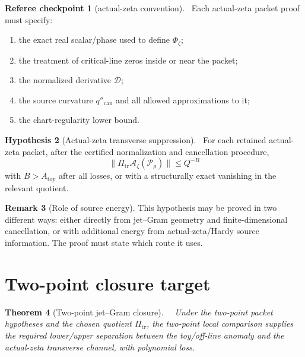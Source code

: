 \documentclass[11pt,a4paper]{amsart}
\newcommand{\Status}[1]{\textnormal{\fbox{\scriptsize\textsf{#1}}}}
\newcommand{\Core}{\Status{CORE}}
\newcommand{\Open}{\Status{OPEN}}
\newcommand{\Ph}{\Phi}
\newcommand{\D}{\mathcal D}
\newcommand{\Packet}{\mathcal P}
\newcommand{\Scale}{Q}
\newcommand{\can}{\mathrm{can}}
\newcommand{\toy}{\mathrm{toy}}
\newcommand{\trans}{\mathrm{tr}}
\theoremstyle{plain}
\newtheorem{theorem}{Theorem}[section]
\theoremstyle{definition}
\newtheorem{hypothesis}[theorem]{Hypothesis}
\newtheorem{checkpoint}[theorem]{Referee checkpoint}
\newtheorem{remark}[theorem]{Remark}
\begin{document}
\begin{checkpoint}[actual-zeta convention]
\label{chk:actual-zeta-convention}
\Core\
Each actual-zeta packet proof must specify:
\begin{enumerate}[label=\textup{Z\arabic*.},leftmargin=*]
\item the exact real scalar/phase used to define \(\Ph_\zeta\);
\item the treatment of critical-line zeros inside or near the packet;
\item the normalized derivative \(\D\);
\item the source curvature \(q''_{\can}\) and all allowed approximations to it;
\item the chart-regularity lower bound.
\end{enumerate}
\end{checkpoint}

\begin{hypothesis}[Actual-zeta transverse suppression]
\label{hyp:actual-zeta-transverse-suppression}
\Open\
For each retained actual-zeta packet, after the certified normalization and cancellation procedure,
\[
        \|\Pi_{\trans}\mathcal A_\zeta(\Packet_\rho)\|
        \le \Scale^{-B}
\]
with \(B>A_{\toy}\) after all losses, or with a structurally exact vanishing in the relevant quotient.
\end{hypothesis}

\begin{remark}[Role of source energy]
This hypothesis may be proved in two different ways: either directly from jet--Gram geometry and finite-dimensional cancellation, or with additional energy from actual-zeta/Hardy source information.  The proof must state which route it uses.
\end{remark}

\section{Two-point closure target}
\label{sec:two-point-closure-target}

\begin{theorem}[Two-point jet--Gram closure]
\label{thm:two-point-jetgram-closure-target}
\Core\ \Open\
Under the two-point packet hypotheses and the chosen quotient \(\Pi_{\trans}\), the two-point local comparison supplies the required lower/upper separation between the toy/off-line anomaly and the actual-zeta transverse channel, with polynomial loss.
\end{theorem}
\end{document}
